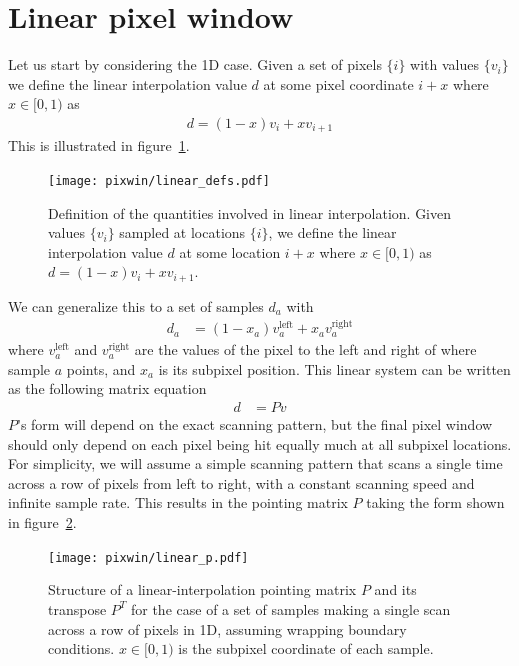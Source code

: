 \documentclass[twocolumn,apj]{aastex63}
\begin{document}



\clearpage

\appendix

\section{Linear pixel window}
\label{sec:linwin}
Let us start by considering the 1D case. Given a set of pixels $\{i\}$ with values $\{v_i\}$
we define the linear interpolation value $d$ at some pixel coordinate $i+x$ where $x\in[0,1)$ as
\begin{align}
	d = (1-x)v_i + x v_{i+1}
\end{align}
This is illustrated in figure~\ref{fig:linear-defs}.
\begin{figure}[h]
	\center
	\texttt{[image: pixwin/linear\_defs.pdf]}
	\caption{Definition of the quantities involved in linear interpolation.
	Given values $\{v_i\}$ sampled at locations $\{i\}$, we define the linear interpolation
	value $d$ at some location $i+x$ where $x\in[0,1)$ as $d = (1-x)v_i + x v_{i+1}$.}
	\label{fig:linear-defs}
\end{figure}

We can generalize this to a set of samples $d_a$ with
\begin{align}
	d_a &= (1-x_a) v_a^\text{left} + x_a v_a^\text{right}
\end{align}
where $v_a^\text{left}$ and $v_a^\text{right}$ are the values of the pixel to the left and right
of where sample $a$ points, and $x_a$ is its subpixel position. This linear system can be written
as the following matrix equation
\begin{align}
	d &= P v
\end{align}
$P$'s form will depend on the exact scanning pattern, but the final pixel window should only depend
on each pixel being hit equally much at all subpixel locations. For simplicity, we will assume a simple
scanning pattern that scans a single time across a row of pixels from left to right, with a constant
scanning speed and infinite sample rate. This results in the pointing matrix $P$ taking the form
shown in figure~\ref{fig:linear-p}.
\begin{figure}[h]
	\center
	\texttt{[image: pixwin/linear\_p.pdf]}
	\caption{Structure of a linear-interpolation pointing matrix $P$ and its transpose $P^T$
	for the case of a set of samples making a single scan across a row of pixels in 1D, assuming
	wrapping boundary conditions. $x \in [0,1)$ is the subpixel coordinate of each sample.}
	\label{fig:linear-p}
\end{figure}
\end{document}
